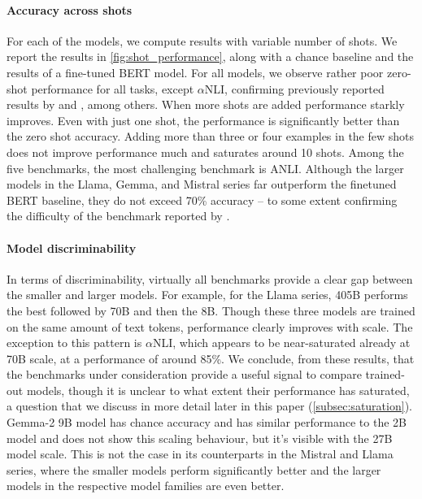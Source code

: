 \paragraph{Accuracy across shots}
For each of the models, we compute results with variable number of shots.
We report the results in \cref{fig:shot_performance}, along with a chance baseline and the results of a fine-tuned BERT model.
For all models, we observe rather poor zero-shot performance for all tasks, except $\alpha$NLI, confirming previously reported results by \citet{ohmer2024form} and \citet{weber-etal-2023-mind}, among others.
When more shots are added performance starkly improves.
Even with just one shot, the performance is significantly better than the zero shot accuracy.
Adding more than three or four examples in the few shots does not improve performance much and saturates around 10 shots. 
Among the five benchmarks, the most challenging benchmark is ANLI.
Although the larger models in the Llama, Gemma, and Mistral series far outperform the finetuned BERT baseline, they do not exceed 70\% accuracy -- to some extent confirming the difficulty of the benchmark reported by \citet{brown2020language}.

\paragraph{Model discriminability}
In terms of discriminability, virtually all benchmarks provide a clear gap between the smaller and larger models.
For example, for the Llama series, 405B performs the best followed by 70B and then the 8B.
Though these three models are trained on the same amount of text tokens, performance clearly improves with scale.
The exception to this pattern is $\alpha$NLI, which appears to be near-saturated already at 70B scale, at a performance of around 85\%.
We conclude, from these results, that the benchmarks under consideration provide a useful signal to compare trained-out models, though it is unclear to what extent their performance has saturated, a question that we discuss in more detail later in this paper (\cref{subsec:saturation}).
Gemma-2 9B model has chance accuracy and has similar performance to the 2B model and does not show this scaling behaviour, but it's visible with the 27B model scale. This is not the case in its counterparts in the Mistral and Llama series, where the smaller models perform significantly better and the larger models in the respective model families are even better.

